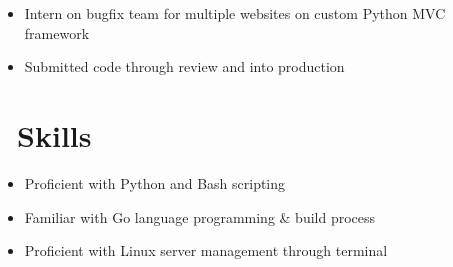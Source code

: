 \documentclass{resume}
\begin{document}
\begin{itemize}
  \item Intern on bugfix team for multiple websites on custom Python MVC framework
  \item Submitted code through review and into production
\end{itemize}


\section{\faCogs\ Skills}
\begin{itemize}[parsep=0.5ex]
  \item Proficient with Python and Bash scripting
  \item Familiar with Go language programming \& build process
  \item Proficient with Linux server management through terminal
\end{itemize}

%
%
\end{document}
